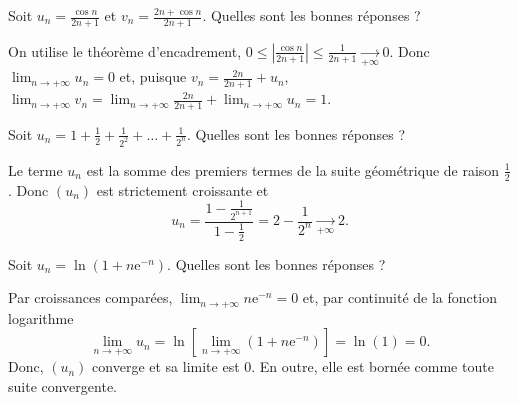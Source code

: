 \begin{question}
Soit $\displaystyle u_n=\frac{\cos n}{2n+1}$ et $\displaystyle v_n=\frac{2n+\cos n}{2n+1}$. Quelles sont les bonnes réponses ?
\begin{answers}  
\end{answers}
\begin{explanations}
On utilise le théorème d'encadrement, $\displaystyle 0\leq \left|\frac{\cos n}{2n+1}\right|\leq \frac{1}{2n+1}\underset{+\infty}{\longrightarrow }0$. Donc $\displaystyle \lim _{n\to +\infty}u_n=0$ et, puisque $\displaystyle v_n=\frac{2n}{2n+1}+u_n$, $\displaystyle \lim _{n\to +\infty}v_n=\lim _{n\to +\infty}\frac{2n}{2n+1}+\lim _{n\to +\infty}u_n=1$.
\end{explanations}
\end{question}



\begin{question}
Soit $\displaystyle u_n=1+\frac{1}{2}+\frac{1}{2^2}+\dots +\frac{1}{2^n}$. Quelles sont les bonnes réponses ?
\begin{answers}  
\end{answers}
\begin{explanations}
Le terme $u_n$ est la somme des premiers termes de la suite géométrique de raison $\displaystyle \frac{1}{2}$. Donc $(u_n)$ est strictement croissante et
$$u_n=\frac{1-\frac{1}{2^{n+1}}}{1-\frac{1}{2}}=2-\frac{1}{2^n}\underset{+\infty}{\longrightarrow }2.$$
\end{explanations}
\end{question}



\begin{question}
Soit $\displaystyle u_n=\ln \left(1+n\mathrm{e}^{-n}\right)$. Quelles sont les bonnes réponses ?
\begin{answers}
\end{answers}
\begin{explanations}
Par croissances comparées, $\displaystyle \lim _{n\to +\infty}n\mathrm{e}^{-n}=0$ et, par continuité de la fonction logarithme
$$\lim _{n\to +\infty}u_n=\ln \left[\lim _{n\to +\infty}\left(1+n\mathrm{e}^{-n}\right)\right]=\ln (1)=0.$$
Donc, $(u_n)$ converge et sa limite est $0$. En outre, elle est bornée comme toute suite convergente.
\end{explanations}
\end{question}




